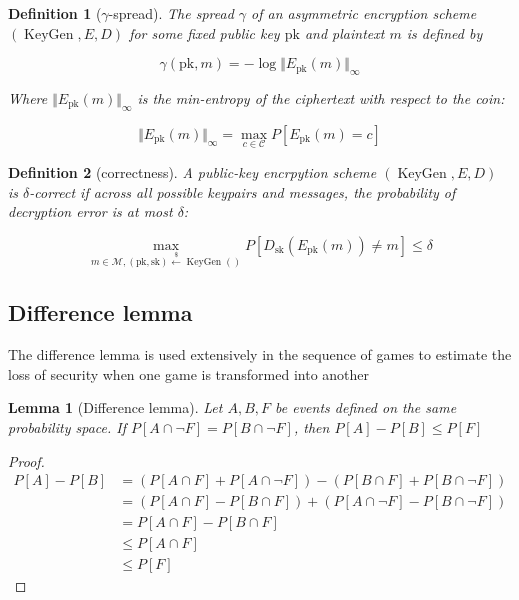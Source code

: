 \documentclass{article}
\newcommand{\Norm}[1]{\Vert {#1} \Vert}
\newcommand{\leftsample}{\overset{{\scriptscriptstyle\$}}{\leftarrow}}
\newtheorem{definition}{Definition}[section]
\newtheorem{lemma}{Lemma}
\begin{document}
\begin{definition}[$\gamma$-spread]
    The spread $\gamma$ of an asymmetric encryption scheme $(\operatorname{KeyGen}, E, D)$ for some fixed public key $\text{pk}$ and plaintext $m$ is defined by

    \begin{equation*}
        \gamma(\text{pk}, m) = -\log{\Norm{E_\text{pk}(m)}_\infty}
    \end{equation*}

    Where $\Norm{E_\text{pk}(m)}_\infty$ is the min-entropy of the ciphertext with respect to the coin:

    \begin{equation*}
        \Norm{E_\text{pk}(m)}_\infty 
        = \max_{c \in \mathcal{C}} P[E_\text{pk}(m) = c]
    \end{equation*}
\end{definition}

\begin{definition}[correctness]
    A public-key encrpytion scheme $(\operatorname{KeyGen}, E, D)$ is $\delta$-correct if across all possible keypairs and messages, the probability of decryption error is at most $\delta$:

    \begin{equation*}
        \max_{
            m \in \mathcal{M},
            (\text{pk}, \text{sk}) \leftsample \operatorname{KeyGen}()
        } P[D_\text{sk}(E_\text{pk}(m)) \neq m]
        \leq \delta
    \end{equation*}
\end{definition}

\subsection{Difference lemma}
The difference lemma is used extensively in the sequence of games to estimate the loss of security when one game is transformed into another

\begin{lemma}[Difference lemma]
    Let $A, B, F$ be events defined on the same probability space. If $P[A \cap \neg F] = P[B \cap \neg F]$, then $P[A] - P[B] \leq P[F]$
\end{lemma}

\begin{proof}
    \begin{equation*}
        \begin{aligned}
            P[A] - P[B] &= (P[A \cap F] + P[A \cap \neg F]) 
                - (P[B \cap F] + P[B \cap \neg F]) \\
            &= (P[A \cap F] - P[B \cap F]) 
                + (P[A \cap \neg F] - P[B \cap \neg F]) \\
            &= P[A \cap F] - P[B \cap F] \\
            &\leq P[A \cap F] \\
            &\leq P[F]
        \end{aligned}
    \end{equation*}
\end{proof}
\end{document}
